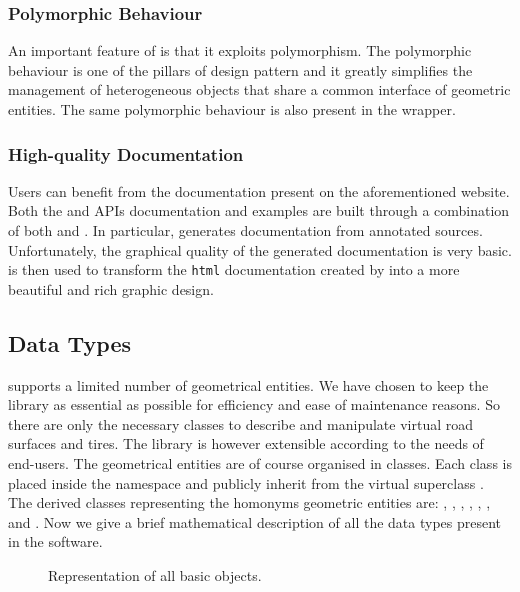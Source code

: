 \subsubsection{Polymorphic Behaviour}
An important feature of \Acme{} is that it exploits \cpp{} polymorphism. The polymorphic behaviour is one of the pillars of \Acme{} design pattern and it greatly simplifies the management of heterogeneous objects that share a common interface of geometric entities. The same \cpp{} polymorphic behaviour is also present in the \Matlab{} \Mex{} wrapper.

\subsubsection{High-quality Documentation}
Users can benefit from the documentation present on the aforementioned website. Both the \cpp{} and \Matlab{} \Mex{} APIs documentation and examples are built through a combination of both \Doxygen{} and \Sphinx{}. In particular, \Doxygen{} generates documentation from annotated \cpp{} sources. Unfortunately, the graphical quality of the generated documentation is very basic. \Sphinx{} is then used to transform the \texttt{html} documentation created by \Doxygen{} into a more beautiful and rich graphic design.

\subsection{Data Types}
\Acme{} supports a limited number of geometrical entities. We have chosen to keep the library as essential as possible for efficiency and ease of maintenance reasons. So there are only the necessary classes to describe and manipulate virtual road surfaces and tires. The library is however extensible according to the needs of end-users. The geometrical entities are of course organised in classes. Each class is placed inside the namespace \Acme{} and publicly inherit from the virtual superclass \Entity{}. The derived classes representing the homonyms geometric entities are: \Point{}, \Line{}, \Ray{}, \Plane{}, \Segment{}, \Triangle{}, \Disk{} and \Ball{}. Now we give a brief mathematical description of all the data types present in the software.

\begin{figure*}[!ht]
  \centering
  
  \caption{Representation of all \Acme{} basic \Entity{} objects.}
  \label{fig::entities}
\end{figure*}

